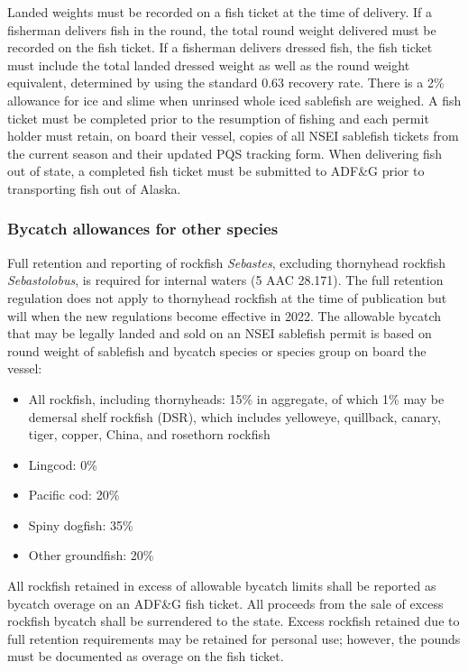 \documentclass[
]{article}
\providecommand{\tightlist}{%
  \setlength{\itemsep}{0pt}\setlength{\parskip}{0pt}}
\begin{document}
Landed weights must be recorded on a fish ticket at the time of
delivery. If a fisherman delivers fish in the round, the total round
weight delivered must be recorded on the fish ticket. If a fisherman
delivers dressed fish, the fish ticket must include the total landed
dressed weight as well as the round weight equivalent, determined by
using the standard 0.63 recovery rate. There is a 2\% allowance for ice
and slime when unrinsed whole iced sablefish are weighed. A fish ticket
must be completed prior to the resumption of fishing and each permit
holder must retain, on board their vessel, copies of all NSEI sablefish
tickets from the current season and their updated PQS tracking form.
When delivering fish out of state, a completed fish ticket must be
submitted to ADF\&G prior to transporting fish out of Alaska.

\hypertarget{bycatch-allowances-for-other-species}{%
\subsubsection{Bycatch allowances for other
species}\label{bycatch-allowances-for-other-species}}

Full retention and reporting of rockfish \emph{Sebastes}, excluding
thornyhead rockfish \emph{Sebastolobus}, is required for internal waters
(5 AAC 28.171). The full retention regulation does not apply to
thornyhead rockfish at the time of publication but will when the new
regulations become effective in 2022. The allowable bycatch that may be
legally landed and sold on an NSEI sablefish permit is based on round
weight of sablefish and bycatch species or species group on board the
vessel:

\begin{itemize}
\tightlist
\item
  All rockfish, including thornyheads: 15\% in aggregate, of which 1\%
  may be demersal shelf rockfish (DSR), which includes yelloweye,
  quillback, canary, tiger, copper, China, and rosethorn rockfish
\item
  Lingcod: 0\%
\item
  Pacific cod: 20\%
\item
  Spiny dogfish: 35\%
\item
  Other groundfish: 20\%
\end{itemize}

All rockfish retained in excess of allowable bycatch limits shall be
reported as bycatch overage on an ADF\&G fish ticket. All proceeds from
the sale of excess rockfish bycatch shall be surrendered to the state.
Excess rockfish retained due to full retention requirements may be
retained for personal use; however, the pounds must be documented as
overage on the fish ticket.
\end{document}
